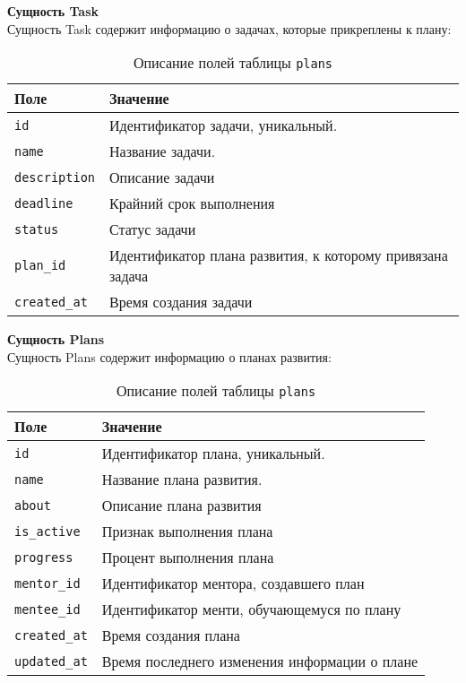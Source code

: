 \noindent\textbf{Сущность Task}\\
Сущность Task содержит информацию о задачах, которые прикреплены к плану:
\begin{table}[!ht]
    \caption{Описание полей таблицы \texttt{plans}}
    \label{tbl:task}
    \begin{center}
        \begin{tabular}{|p{}p{}|}
            \hline
            \textbf{Поле} & \textbf{Значение} \\\hline
            \texttt{id} & Идентификатор задачи, уникальный. \\\hline
            \texttt{name} & Название задачи. \\\hline
            \texttt{description} & Описание задачи \\\hline
            \texttt{deadline} & Крайний срок выполнения \\\hline
            \texttt{status} & Статус задачи \\\hline
            \texttt{plan\_id} & Идентификатор плана развития, к которому привязана задача \\\hline
            \texttt{created\_at} & Время создания задачи\\\hline
        \end{tabular}
    \end{center}
\end{table}


\newpage
\noindent\textbf{Сущность Plans}\\
Сущность Plans содержит информацию о планах развития:
\begin{table}[!ht]
    \caption{Описание полей таблицы \texttt{plans}}
    \label{tbl:plans}
    \begin{center}
        \begin{tabular}{|p{}p{}|}
            \hline
            \textbf{Поле} & \textbf{Значение} \\\hline
            \texttt{id} & Идентификатор плана, уникальный. \\\hline
            \texttt{name} & Название плана развития. \\\hline
            \texttt{about} & Описание плана развития\\\hline
            \texttt{is\_active} & Признак выполнения плана \\\hline
            \texttt{progress} & Процент выполнения плана \\\hline
            \texttt{mentor\_id} & Идентификатор ментора, создавшего план \\\hline
            \texttt{mentee\_id} & Идентификатор менти, обучающемуся по плану \\\hline
            \texttt{created\_at} & Время создания плана \\\hline
            \texttt{updated\_at} & Время последнего изменения информации о плане \\\hline
        \end{tabular}
    \end{center}
\end{table}


